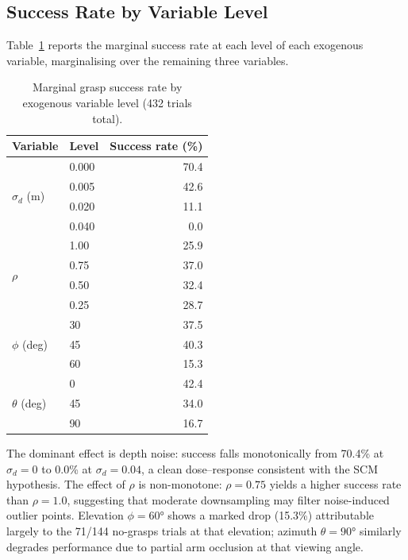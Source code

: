 \documentclass[11pt,a4paper]{report}
\begin{document}
\subsection{Success Rate by Variable Level}

Table~\ref{tab:success_by_var} reports the marginal success rate at each level of each exogenous variable, marginalising over the remaining three variables.

\begin{table}[t]
  \caption{Marginal grasp success rate by exogenous variable level (432 trials total).}
  \label{tab:success_by_var}
  \centering
  \begin{tabular}{llr}
    \toprule
    \textbf{Variable} & \textbf{Level} & \textbf{Success rate (\%)} \\
    \midrule
    \multirow{4}{*}{$\sigma_d$ (m)}
      & 0.000 & 70.4 \\
      & 0.005 & 42.6 \\
      & 0.020 & 11.1 \\
      & 0.040 &  0.0 \\
    \midrule
    \multirow{4}{*}{$\rho$}
      & 1.00  & 25.9 \\
      & 0.75  & 37.0 \\
      & 0.50  & 32.4 \\
      & 0.25  & 28.7 \\
    \midrule
    \multirow{3}{*}{$\phi$ (deg)}
      & 30    & 37.5 \\
      & 45    & 40.3 \\
      & 60    & 15.3 \\
    \midrule
    \multirow{3}{*}{$\theta$ (deg)}
      & 0     & 42.4 \\
      & 45    & 34.0 \\
      & 90    & 16.7 \\
    \bottomrule
  \end{tabular}
\end{table}

The dominant effect is depth noise: success falls monotonically from 70.4\% at $\sigma_d = 0$ to 0.0\% at $\sigma_d = 0.04$, a clean dose--response consistent with the SCM hypothesis. The effect of $\rho$ is non-monotone: $\rho = 0.75$ yields a higher success rate than $\rho = 1.0$, suggesting that moderate downsampling may filter noise-induced outlier points. Elevation $\phi = 60°$ shows a marked drop (15.3\%) attributable largely to the 71/144 no-grasps trials at that elevation; azimuth $\theta = 90°$ similarly degrades performance due to partial arm occlusion at that viewing angle.
\end{document}
